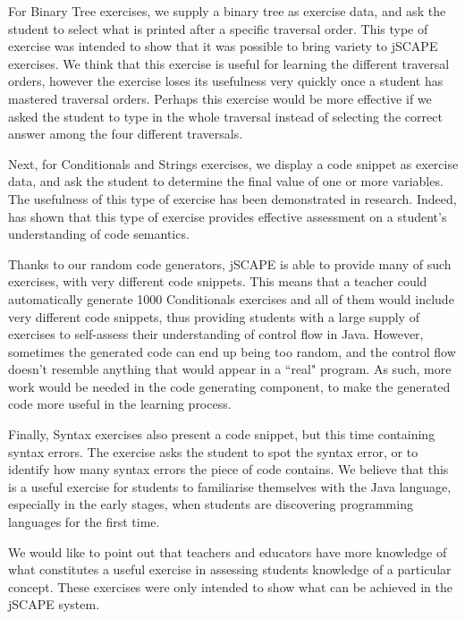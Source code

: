 For Binary Tree exercises, we supply a binary tree as exercise data, and ask the student to select what is printed after a specific traversal order. This type of exercise was intended to show that it was possible to bring variety to jSCAPE exercises. We think that this exercise is useful for learning the different traversal orders, however the exercise loses its usefulness very quickly once a student has mastered traversal orders. Perhaps this exercise would be more effective if we asked the student to type in the whole traversal instead of selecting the correct answer among the four different traversals.\newline

Next, for Conditionals and Strings exercises, we display a code snippet as exercise data, and ask the student to determine the final value of one or more variables. The usefulness of this type of exercise has been demonstrated in research. Indeed, \cite{Lister} has shown that this type of exercise provides effective assessment on a student's understanding of code semantics.\newline

Thanks to our random code generators, jSCAPE is able to provide many of such exercises, with very different code snippets. This means that a teacher could automatically generate 1000 Conditionals exercises and all of them would include very different code snippets, thus providing students with a large supply of exercises to self-assess their understanding of control flow in Java. However, sometimes the generated code can end up being too random, and the control flow doesn't resemble anything that would appear in a ``real" program. As such, more work would be needed in the code generating component, to make the generated code more useful in the learning process. \newline

Finally, Syntax exercises also present a code snippet, but this time containing syntax errors. The exercise asks the student to spot the syntax error, or to identify how many syntax errors the piece of code contains. We believe that this is a useful exercise for students to familiarise themselves with the Java language, especially in the early stages, when students are discovering programming languages for the first time. \newline

We would like to point out that teachers and educators have more knowledge of what constitutes a useful exercise in assessing students knowledge of a particular concept. These exercises were only intended to show what can be achieved in the jSCAPE system.

